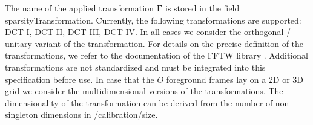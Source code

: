 \documentclass[landscape,a4paper]{article} %
\newcommand{\inlvar}[1]{{\ttfamily#1}}
\begin{document}
\begin{multicols}{2}
The name of the applied transformation $\mathbf{\Gamma}$ is stored in the field \inlvar{sparsityTransformation}. Currently, the following transformations are supported: DCT-I, DCT-II, DCT-III, DCT-IV. In all cases we consider the orthogonal / unitary variant of the transformation. For details on the precise definition of the transformations, we refer to the documentation of the FFTW library \cite{FFTW05}. Additional transformations are not standardized and must be integrated into this specification before use. In case that the $O$ foreground frames lay on a 2D or 3D grid we consider the multidimensional versions of the transformations. The dimensionality of the transformation can be derived from the number of non-singleton dimensions in \inlvar{/calibration/size}. 

\end{multicols}
\end{document}
